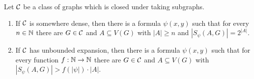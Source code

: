 \begin{theorem}\label{thm:vc-density-lower-bound}
Let $\mathcal{C}$ be a class of graphs which 
is closed under taking subgraphs. 
\begin{enumerate}
\item If $\mathcal{C}$ is somewhere dense, then there is a formula 
$\psi(x,y)$ such that for every $n\in \mathbb{N}$ there are $G\in\mathcal{C}$ and $A\subseteq V(G)$ 
with $|A|\geq n$ and $|S_\psi(A,G)|=2^{|A|}$. 
\item If $\mathcal{C}$ has unbounded expansion, then there is a formula 
$\psi(x,y)$ such that for every function $f:\mathbb{N}\rightarrow \mathbb{N}$ 
there are $G\in\mathcal{C}$ and $A\subseteq V(G)$ 
with $|S_\psi(A,G)|>f(|\psi|)\cdot |A|$. 
\end{enumerate}
\end{theorem}



%




